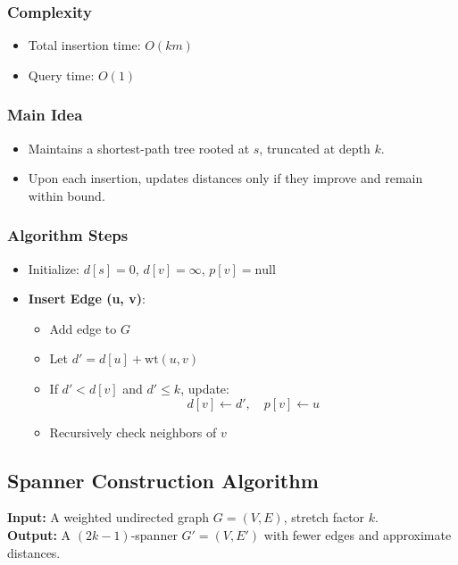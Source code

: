 \documentclass{report}
\begin{document}
\subsubsection*{Complexity}
\begin{itemize}
    \item Total insertion time: \( O(km) \)
    \item Query time: \( O(1) \)
\end{itemize}

\subsubsection*{Main Idea}
\begin{itemize}
    \item Maintains a shortest-path tree rooted at \( s \), truncated at depth \( k \).
    \item Upon each insertion, updates distances only if they improve and remain within bound.
\end{itemize}

\subsubsection*{Algorithm Steps}
\begin{itemize}
    \item Initialize: \( d[s] = 0 \), \( d[v] = \infty \), \( p[v] = \text{null} \)
    \item \textbf{Insert Edge (u, v)}:
    \begin{itemize}
        \item Add edge to \( G \)
        \item Let \( d' = d[u] + \text{wt}(u,v) \)
        \item If \( d' < d[v] \) and \( d' \leq k \), update:
        \[
        d[v] \leftarrow d', \quad p[v] \leftarrow u
        \]
        \item Recursively check neighbors of \( v \)
    \end{itemize}
\end{itemize}

\subsection*{Spanner Construction Algorithm}

\textbf{Input:} A weighted undirected graph \( G = (V, E) \), stretch factor \( k \).\\
\textbf{Output:} A \((2k - 1)\)-spanner \( G' = (V, E') \) with fewer edges and approximate distances.
\end{document}
